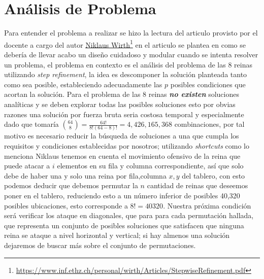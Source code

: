 \documentclass[paper=a4, fontsize=12pt]{article} 		%
\newcommand\fnurl[2]{%
\href{#2}{#1}\footnote{\url{#2}}%
}
\numberwithin{equation}{section}						%
\numberwithin{table}{section} 							%
\begin{document}
\section{Análisis de Problema}
Para entender el problema a realizar se hizo la lectura del articulo provisto por el docente a cargo del autor \fnurl{Niklaus Wirth}{https://www.inf.ethz.ch/personal/wirth/Articles/StepwiseRefinement.pdf} en el articulo se plantea en como se debería de llevar acabo un diseño cuidadoso y modular cuando se intenta resolver un problema, el problema en contexto es el análisis del problema de las 8 reinas utilizando \emph{step refinement}, la idea es descomponer la solución planteada tanto como sea posible, estableciendo adecuadamente las $p$ posibles condiciones que acortan la solución. Para el problema de las 8 reinas \textbf{\textit{no existen}} soluciones analíticas y se deben explorar todas las posibles soluciones esto por obvias razones una solución por fuerza bruta seria costosa temporal y especialmente dado que tomaría $ \binom {64} {8}=\frac { 64! }{ 8!(64-8)! } =4,426,165,368$ combinaciones, por tal motivo es necesario reducir la búsqueda de soluciones a una que cumpla los requisitos y condiciones establecidas por nosotros; utilizando \textit{shortcuts} como lo menciona Niklaus tenemos en cuenta el movimiento ofensivo de la reina que puede atacar a $i$ elementos en su fila y columna correspondiente, así que solo debe de haber una y solo una reina por fila,columna $x,y$ del tablero, con esto podemos deducir que debemos permutar la $n$ cantidad de reinas que deseemos poner en el tablero, reduciendo esto a un número inferior de posibles 40,320 posibles ubicaciones, esto corresponde a $8!=40320$. Nuestra próxima condición será verificar los ataque en diagonales, que para para cada  permutación hallada, que representa un conjunto de posibles soluciones que satisfacen que ninguna reina se ataque a nivel horizontal y vertical; si hay almenos una solución dejaremos de buscar más sobre el conjunto de permutaciones. 
\end{document}
